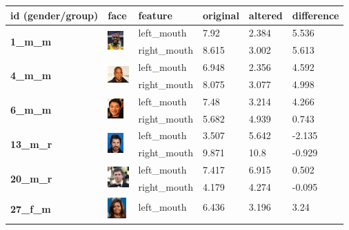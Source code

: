 \documentclass{l4proj}
\begin{document}
\begin{table}[h!]
\centering
\begin{tabular}{|l|l|l|l|l|l|}
\hline
\textbf{id (gender/group)} & \textbf{face} & \textbf{feature} & \textbf{original} & \textbf{altered} & \textbf{difference} \\ \hline
\multirow{2}{*}{\textbf{1\_m\_m}} & \multirow{2}{*}{\includegraphics[width=6mm]{images/01_m_m.jpg}} & left\_mouth & 7.92 & 2.384 & 5.536 \\ \cline{3-6} 
 &  & right\_mouth & 8.615 & 3.002 & 5.613 \\ \hline
\multirow{2}{*}{\textbf{4\_m\_m}} & \multirow{2}{*}{\includegraphics[width=8mm]{images/04_m_m.jpg}} & left\_mouth & 6.948 & 2.356 & 4.592 \\ \cline{3-6} 
 &  & right\_mouth & 8.075 & 3.077 & 4.998 \\ \hline
\multirow{2}{*}{\textbf{6\_m\_m}} & \multirow{2}{*}{\includegraphics[width=6mm]{images/06_m_m.jpg}} & left\_mouth & 7.48 & 3.214 & 4.266 \\ \cline{3-6} 
 &  & right\_mouth & 5.682 & 4.939 & 0.743 \\ \hline
\multirow{2}{*}{\textbf{13\_m\_r}} & \multirow{2}{*}{\includegraphics[width=6mm]{images/13_m_r.jpg}} & left\_mouth & 3.507 & 5.642 & -2.135 \\ \cline{3-6} 
 &  & right\_mouth & 9.871 & 10.8 & -0.929 \\ \hline
\multirow{2}{*}{\textbf{20\_m\_r}} & \multirow{2}{*}{\includegraphics[width=8mm]{images/20_m_r.jpg}} & left\_mouth & 7.417 & 6.915 & 0.502 \\ \cline{3-6} 
 &  & right\_mouth & 4.179 & 4.274 & -0.095 \\ \hline
\multirow{2}{*}{\textbf{27\_f\_m}} & \multirow{2}{*}{\includegraphics[width=7mm]{images/27_f_m.jpg}} & left\_mouth & 6.436 & 3.196 & 3.24 \\ \cline{3-6} 

\end{tabular}
\end{table}
\end{document}
